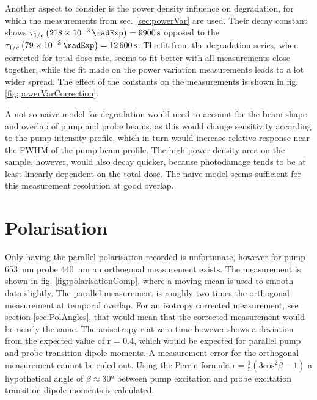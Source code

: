 \documentclass[twoside,openright,listof=numbered]{scrreprt}
\begin{document}
Another aspect to consider is the power density influence on degradation, for which the measurements from sec. \ref{sec:powerVar} are used.  Their decay constant shows $\tau_{1/e}\left(\SI{218e-3}{\radExp}\right)=\SI{9900}{\second}$  opposed to the $\tau_{1/e}\left(\SI{79e-3}{\radExp}\right)=\SI{12600}{\second}$. The fit from the degradation series, when corrected for total dose rate, seems to fit better with all measurements close together, while the fit made on the power variation measurements leads to a lot wider spread. The effect of the constants on the measurements is shown in fig. \ref{fig:powerVarCorrection}.

A not so naive model for degradation would need to account for the beam shape and overlap of pump and probe beams, as this would change sensitivity according to the pump intensity profile, which in turn would increase relative response near the FWHM of the pump beam profile. The high power density area on the sample, however, would also decay quicker, because photodamage tends to be at least linearly dependent on the total dose. The naive model seems sufficient for this measurement resolution at good overlap.

\section{Polarisation}
Only having the parallel polarisation recorded is unfortunate, however for pump \SI{653}{\nano\meter} probe \SI{440}{\nano\meter} an orthogonal measurement exists. The measurement is shown in fig. \ref{fig:polarisationComp}, where a moving mean is used to smooth data slightly. The parallel measurement is roughly two times the orthogonal measurement at temporal overlap. For an isotropy corrected measurement, see section \ref{sec:PolAngles}, that would mean that the corrected measurement would be nearly the same. The anisotropy r at zero time however shows a deviation from the expected value of r = 0.4, which would be expected for parallel pump and probe transition dipole moments. A measurement error for the orthogonal measurement cannot be ruled out. Using the Perrin formula $\mathrm{r} = \frac{1}{5}(3\mathrm{cos}^2\beta-1)$ a hypothetical angle of $\beta \approx \ang{30}$ between pump excitation and probe excitation transition dipole moments is calculated.
\end{document}
